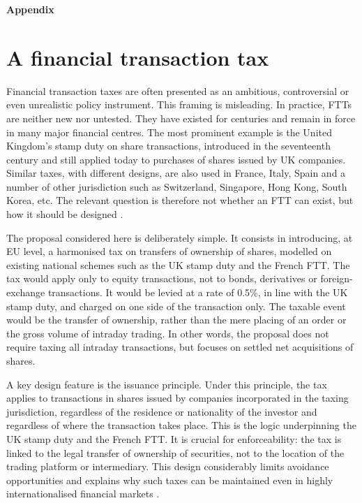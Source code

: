 \documentclass[../../main]{subfiles}
\begin{document}
\newpage 

\textbf{\LARGE{Appendix}}

\section{A financial transaction tax}

Financial transaction taxes are often presented as an ambitious, controversial or even unrealistic policy instrument. This framing is misleading. In practice, FTTs are neither new nor untested. They have existed for centuries and remain in force in many major financial centres. The most prominent example is the United Kingdom’s stamp duty on share transactions, introduced in the seventeenth century and still applied today to purchases of shares issued by UK companies. Similar taxes, with different designs, are also used in France, Italy, Spain and a number of other jurisdiction such as Switzerland, Singapore, Hong Kong, South Korea, etc. The relevant question is therefore not whether an FTT can exist, but how it should be designed \citep{CapelleBlancard2024}.

The proposal considered here is deliberately simple. It consists in introducing, at EU level, a harmonised tax on transfers of ownership of shares, modelled on existing national schemes such as the UK stamp duty and the French FTT. The tax would apply only to equity transactions, not to bonds, derivatives or foreign-exchange transactions. It would be levied at a rate of 0.5\%, in line with the UK stamp duty, and charged on one side of the transaction only. The taxable event would be the transfer of ownership, rather than the mere placing of an order or the gross volume of intraday trading. In other words, the proposal does not require taxing all intraday transactions, but focuses on settled net acquisitions of shares.

A key design feature is the issuance principle. Under this principle, the tax applies to transactions in shares issued by companies incorporated in the taxing jurisdiction, regardless of the residence or nationality of the investor and regardless of where the transaction takes place. This is the logic underpinning the UK stamp duty and the French FTT. It is crucial for enforceability: the tax is linked to the legal transfer of ownership of securities, not to the location of the trading platform or intermediary. This design considerably limits avoidance opportunities and explains why such taxes can be maintained even in highly internationalised financial markets \citep{CapelleBlancardPersaud2025}.
\end{document}
